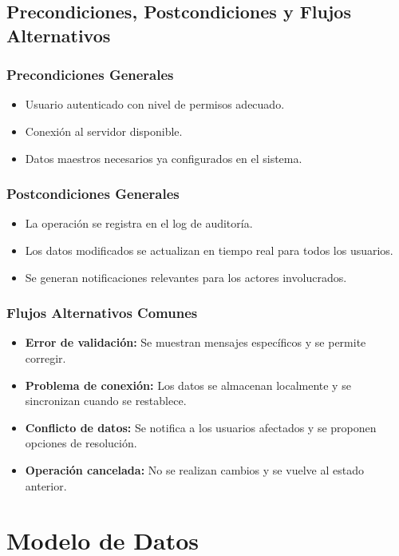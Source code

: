 \documentclass[12pt]{article}
\begin{document}
\subsection{Precondiciones, Postcondiciones y Flujos Alternativos}

\subsubsection{Precondiciones Generales}
\begin{itemize}
  \item Usuario autenticado con nivel de permisos adecuado.
  \item Conexión al servidor disponible.
  \item Datos maestros necesarios ya configurados en el sistema.
\end{itemize}

\subsubsection{Postcondiciones Generales}
\begin{itemize}
  \item La operación se registra en el log de auditoría.
  \item Los datos modificados se actualizan en tiempo real para todos los usuarios.
  \item Se generan notificaciones relevantes para los actores involucrados.
\end{itemize}

\subsubsection{Flujos Alternativos Comunes}
\begin{itemize}
  \item \textbf{Error de validación:} Se muestran mensajes específicos y se permite corregir.
  \item \textbf{Problema de conexión:} Los datos se almacenan localmente y se sincronizan cuando se restablece.
  \item \textbf{Conflicto de datos:} Se notifica a los usuarios afectados y se proponen opciones de resolución.
  \item \textbf{Operación cancelada:} No se realizan cambios y se vuelve al estado anterior.
\end{itemize}

\section{Modelo de Datos}
\end{document}
